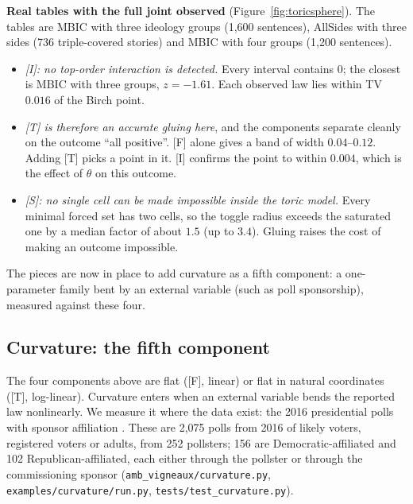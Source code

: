 \documentclass[11pt]{article}
\theoremstyle{definition}
\theoremstyle{remark}
\begin{document}
\textbf{Real tables with the full joint observed} (Figure~\ref{fig:toricsphere}). The tables are MBIC with three ideology groups (1,600 sentences), AllSides with three sides (736 triple-covered stories) and MBIC with four groups (1,200 sentences).
\begin{center}\small
{}
\end{center}
\begin{itemize}
  \item \emph{[I]: no top-order interaction is detected.} Every interval contains $0$; the closest is MBIC with three groups, $z=-1.61$. Each observed law lies within TV $0.016$ of the Birch point.
  \item \emph{[T] is therefore an accurate gluing here}, and the components separate cleanly on the outcome ``all positive''. [F] alone gives a band of width $0.04$--$0.12$. Adding [T] picks a point in it. [I] confirms the point to within $0.004$, which is the effect of $\theta$ on this outcome.
  \item \emph{[S]: no single cell can be made impossible inside the toric model.} Every minimal forced set has two cells, so the toggle radius exceeds the saturated one by a median factor of about $1.5$ (up to $3.4$). Gluing raises the cost of making an outcome impossible.
\end{itemize}
The pieces are now in place to add curvature as a fifth component: a one-parameter family bent by an external variable (such as poll sponsorship), measured against these four.

\subsection{Curvature: the fifth component}\label{sec:curvature}
The four components above are flat ([F], linear) or flat in natural coordinates ([T], log-linear). Curvature enters when an external variable bends the reported law nonlinearly. We measure it where the data exist: the 2016 presidential polls with sponsor affiliation \cite{econpolls}. These are 2,075 polls from 2016 of likely voters, registered voters or adults, from 252 pollsters; 156 are Democratic-affiliated and 102 Republican-affiliated, each either through the pollster or through the commissioning sponsor (\texttt{amb\_vigneaux/curvature.py}, \texttt{examples/curvature/run.py}, \texttt{tests/test\_curvature.py}).
\end{document}
